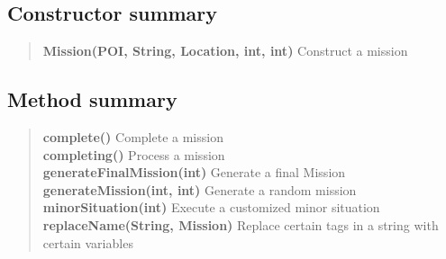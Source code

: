 {{{{\subsection{Constructor summary}{
\begin{verse}
{\bf Mission(POI, String, Location, int, int)} Construct a mission\\
\end{verse}
}
\subsection{Method summary}{
\begin{verse}
{\bf complete()} Complete a mission\\
{\bf completing()} Process a mission\\
{\bf generateFinalMission(int)} Generate a final Mission\\
{\bf generateMission(int, int)} Generate a random mission\\
{\bf minorSituation(int)} Execute a customized minor situation\\
{\bf replaceName(String, Mission)} Replace certain tags in a string with certain variables\\
\end{verse}
}
}}}}
